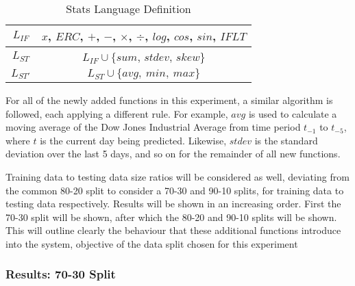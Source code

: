 \documentclass[12pt, letterpaper]{article}
\begin{document}
\begin{table}[h!]
\centering
\begin{tabular}{||c|c||}
\hline
 $L_{IF}$ & $x$, $ERC$, $+$, $-$, $\times$, $\div$, $log$, $cos$, $sin$, $IFLT$ \\
 \hline
 $L_{ST}$ & $L_{IF} \cup \{sum$, $stdev$, $skew$\} \\
\hline
$L_{ST'}$ & $L_{ST} \cup \{avg,\ min,\ max\}$ \\
\hline
\end{tabular}
\caption{Stats Language Definition}
\label{stats-lang}
\end{table}

\textrm{ \indent For all of the newly added functions in this experiment, a similar algorithm is followed, each applying a different rule. For example, $avg$ is used to calculate a moving average of the Dow Jones Industrial Average from time period $t_{-1}$ to $t_{-5}$, where $t$ is the current day being predicted. Likewise, $stdev$ is the standard deviation over the last 5 days, and so on for the remainder of all new functions. }

\textrm{ \indent Training data to testing data size ratios will be considered as well, deviating from the common 80-20 split to consider a 70-30 and 90-10 splits, for training data to testing data respectively. Results will be shown in an increasing order. First the 70-30 split will be shown, after which the 80-20 and 90-10 splits will be shown. This will outline clearly the behaviour that these additional functions introduce into the system, objective of the data split chosen for this experiment}

\subsubsection{Results: 70-30 Split}

\end{document}
